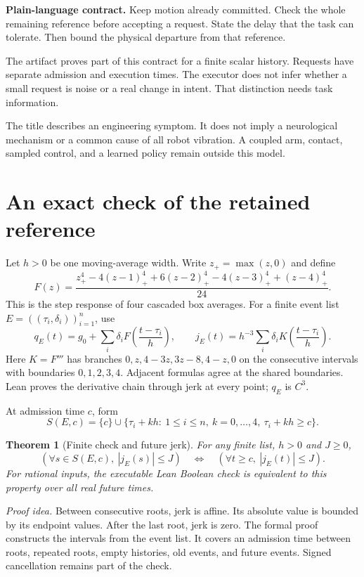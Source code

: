 \documentclass[11pt,letterpaper]{article}
\newtheorem{theorem}{Theorem}
\begin{document}
\textbf{Plain-language contract.} Keep motion already committed. Check the whole remaining reference before accepting a request. State the delay that the task can tolerate. Then bound the physical departure from that reference.

The artifact proves part of this contract for a finite scalar history. Requests have separate admission and execution times. The executor does not infer whether a small request is noise or a real change in intent. That distinction needs task information.

The title describes an engineering symptom. It does not imply a neurological mechanism or a common cause of all robot vibration. A coupled arm, contact, sampled control, and a learned policy remain outside this model.

\newpage
\section{An exact check of the retained reference}
Let $h>0$ be one moving-average width. Write $z_+=\max(z,0)$ and define
\[
F(z)=\frac{z_+^4-4(z-1)_+^4+6(z-2)_+^4-4(z-3)_+^4+(z-4)_+^4}{24}.
\]
This is the step response of four cascaded box averages. For a finite event list $E=((\tau_i,\delta_i))_{i=1}^n$, use
\[
q_E(t)=g_0+\sum_i\delta_i F\left(\frac{t-\tau_i}{h}\right),\qquad
j_E(t)=h^{-3}\sum_i\delta_i K\left(\frac{t-\tau_i}{h}\right).
\]
Here $K=F'''$ has branches $0,z,4-3z,3z-8,4-z,0$ on the consecutive intervals with boundaries $0,1,2,3,4$. Adjacent formulas agree at the shared boundaries. Lean proves the derivative chain through jerk at every point; $q_E$ is $C^3$.

At admission time $c$, form
\[
S(E,c)=\{c\}\cup\{\tau_i+kh:\ 1\leq i\leq n,\ k=0,\ldots,4,\ \tau_i+kh\geq c\}.
\]
\begin{theorem}[Finite check and future jerk]\label{guard}
For any finite list, $h>0$ and $J\geq0$,
\[
(\forall s\in S(E,c),\ |j_E(s)|\leq J)
\quad\Longleftrightarrow\quad
(\forall t\geq c,\ |j_E(t)|\leq J).
\]
For rational inputs, the executable Lean Boolean check is equivalent to this property over all real future times.
\end{theorem}
\textit{Proof idea.} Between consecutive roots, jerk is affine. Its absolute value is bounded by its endpoint values. After the last root, jerk is zero. The formal proof constructs the intervals from the event list. It covers an admission time between roots, repeated roots, empty histories, old events, and future events. Signed cancellation remains part of the check.
\end{document}

